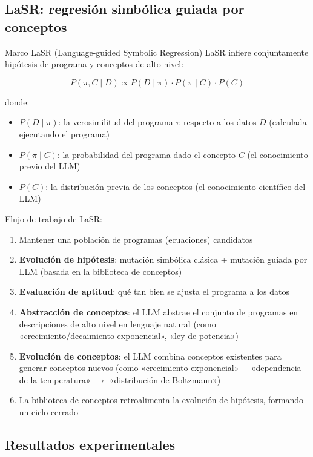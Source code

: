 \documentclass[a4paper]{article}
\begin{document}
\subsection{LaSR: regresión simbólica guiada por conceptos}

\begin{importantbox}{Marco LaSR (Language-guided Symbolic Regression)}
LaSR infiere conjuntamente hipótesis de programa y conceptos de alto nivel:

$$P(\pi, C \mid D) \propto P(D \mid \pi) \cdot P(\pi \mid C) \cdot P(C)$$

donde:
\begin{itemize}
    \item $P(D \mid \pi)$: la verosimilitud del programa $\pi$ respecto a los datos $D$ (calculada ejecutando el programa)
    \item $P(\pi \mid C)$: la probabilidad del programa dado el concepto $C$ (el conocimiento previo del LLM)
    \item $P(C)$: la distribución previa de los conceptos (el conocimiento científico del LLM)
\end{itemize}
\end{importantbox}

Flujo de trabajo de LaSR:
\begin{enumerate}
    \item Mantener una población de programas (ecuaciones) candidatos
    \item \textbf{Evolución de hipótesis}: mutación simbólica clásica + mutación guiada por LLM (basada en la biblioteca de conceptos)
    \item \textbf{Evaluación de aptitud}: qué tan bien se ajusta el programa a los datos
    \item \textbf{Abstracción de conceptos}: el LLM abstrae el conjunto de programas en descripciones de alto nivel en lenguaje natural (como «crecimiento/decaimiento exponencial», «ley de potencia»)
    \item \textbf{Evolución de conceptos}: el LLM combina conceptos existentes para generar conceptos nuevos (como «crecimiento exponencial» + «dependencia de la temperatura» $\to$ «distribución de Boltzmann»)
    \item La biblioteca de conceptos retroalimenta la evolución de hipótesis, formando un ciclo cerrado
\end{enumerate}

\subsection{Resultados experimentales}
\end{document}
